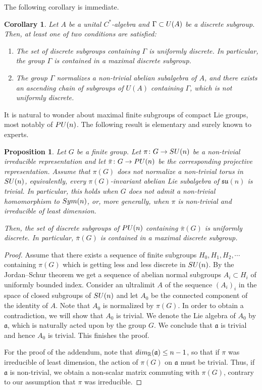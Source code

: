 \documentclass[11pt]{amsproc}
\theoremstyle{plain}
\newtheorem{corollary}[theorem]{Corollary}
\newtheorem{proposition}[theorem]{Proposition}
\theoremstyle{remark}
\begin{document}
The following corollary is immediate.

\begin{corollary}
Let $A$ be a unital $C^*$-algebra and $\Gamma \subset {\rm U}(A)$ be a discrete subgroup. Then, at least one of two conditions are satisfied:
\begin{enumerate}
    \item The set of discrete subgroups containing $\Gamma$ is uniformly discrete. In particular, the group $\Gamma$ is contained in a maximal discrete subgroup.
    \item The group $\Gamma$ normalizes a non-trivial abelian subalgebra of $A$, and there exists an ascending chain of subgroups of $U(A)$ containing $\Gamma$, which is not uniformly discrete.
\end{enumerate}
\end{corollary}

It is natural to wonder about maximal finite subgroups of compact Lie groups, most notably of ${\rm PU}(n)$. The following result is elementary and surely known to experts.
\begin{proposition} \label{compact}
Let $G$ be a finite group. Let $\pi \colon G \to {\rm SU}(n)$ be a non-trivial irreducible representation and let $\bar \pi \colon G \to {\rm PU}(n)$ be the corresponding projective representation. Assume that $\pi(G)$ does not normalize a non-trivial torus in ${\rm SU}(n)$, equivalently, every $\pi(G)$-invariant abelian Lie subalgebra of $\mathfrak{su}(n)$ is trivial.
In particular, this holds when $G$ does not admit a non-trivial homomorphism to ${\rm Sym}(n)$, or, more generally,
when $\pi$ is non-trivial and irreducible of least dimension.
    
Then, the set of discrete subgroups of ${\rm PU}(n)$ containing $\bar\pi(G)$ is uniformly discrete. In particular, $\bar\pi(G)$ is contained in a maximal discrete subgroup.
\end{proposition}
\begin{proof} Assume that there exists a sequence of finite subgroups $H_0, H_1, H_2, \cdots$ containing $\pi(G)$ which is getting less and less discrete in ${\rm SU}(n)$. By the Jordan--Schur theorem we get a sequence of abelian normal subgroups $A_i \subset H_i$ of uniformly bounded index. Consider an ultralimit $A$ of the sequence $(A_i)_i$ in the space of closed subgroups of ${\rm SU}(n)$ and let $A_0$ be the connected component of the identity of $A$. Note that $A_0$ is normalized by $\pi(G)$. In order to obtain a contradiction, we will show that $A_0$ is trivial.
We denote the Lie algebra of $A_0$ by $\mathfrak{a}$, which is naturally acted upon by  the group $G$. We conclude that $\mathfrak{a}$ is trivial and hence $A_0$ is trivial. This finishes the proof.

For the proof of the addendum, note that ${\rm dim}_{\mathbb R} (\mathfrak{a}) \leq n-1$, so that if $\pi$ was irreducible of least dimension, the action of $\pi(G)$ on $\mathfrak{a}$ must be trivial. Thus, if $\mathfrak{a}$ is non-trivial, we obtain a non-scalar matrix commuting with $\pi(G)$, contrary to our assumption that $\pi$ was irreducible.
\end{proof}
\end{document}
